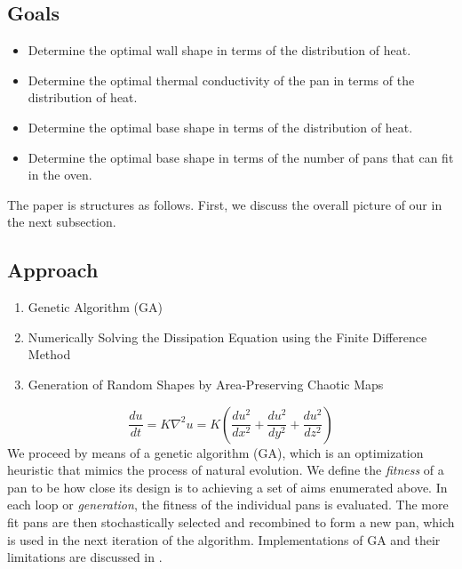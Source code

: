 \documentclass[12pt]{reedmcm}
\begin{document}
\subsection{Goals}
\begin{itemize}
  \item Determine the optimal wall shape in terms of the distribution of heat.
  \item Determine the optimal thermal conductivity of the pan in terms of the distribution of heat.
  \item Determine the optimal base shape in terms of the distribution of heat.
  \item Determine the optimal base shape in terms of the number of pans that can fit in the oven.
\end{itemize}

The paper is structures as follows.
First, we discuss the overall picture of our in the next subsection.

\subsection{Approach}
\begin{enumerate}
  \item Genetic Algorithm (GA)
  \item Numerically Solving the Dissipation Equation using the Finite Difference Method
  \item Generation of Random Shapes by Area-Preserving Chaotic Maps
\end{enumerate}
\begin{equation*}
  \frac{du}{dt} = K \nabla^2 u = K (\frac{du^2}{dx^2} + \frac{du^2}{dy^2} + \frac{du^2}{dz^2})
\end{equation*}
We proceed by means of a genetic algorithm (GA), which is an optimization heuristic that mimics the process of natural evolution.
We define the \emph{fitness} of a pan to be how close its design is to achieving a set of aims enumerated above.
In each loop or \emph{generation}, the fitness of the individual pans is evaluated.
The more fit pans are then stochastically selected and recombined to form a new pan, which is used in the next iteration of the algorithm. 
Implementations of GA and their limitations are discussed in \citet{mitchell}.
\end{document}
